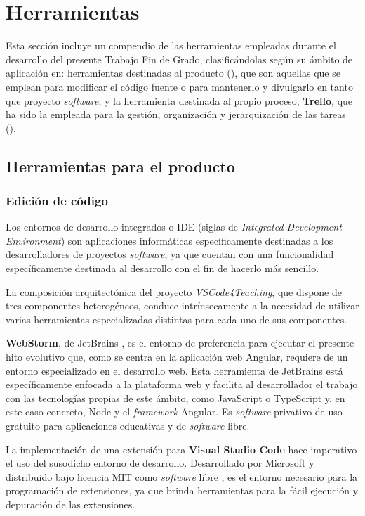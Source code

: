 \section{Herramientas}
\label{sec:herramientas}
Esta sección incluye un compendio de las herramientas empleadas durante el desarrollo del presente Trabajo Fin de Grado, clasificándolas según su ámbito de aplicación en: herramientas destinadas al producto (), que son aquellas que se emplean para modificar el código fuente o para mantenerlo y divulgarlo en tanto que proyecto \textit{software}; y la herramienta destinada al propio proceso, \textbf{Trello}, que ha sido la empleada para la gestión, organización y jerarquización de las tareas ().

\subsection{Herramientas para el producto}
\label{sec:herProducto}

\subsubsection{Edición de código}
\label{subsec:herIDEs}
Los entornos de desarrollo integrados o IDE (siglas de \textit{Integrated Development Environment}) son aplicaciones informáticas específicamente destinadas a los desarrolladores de proyectos \textit{software}, ya que cuentan con una funcionalidad específicamente destinada al desarrollo con el fin de hacerlo más sencillo.

La composición arquitectónica del proyecto \textit{VSCode4Teaching}, que dispone de tres componentes heterogéneos, conduce intrínsecamente a la necesidad de utilizar varias herramientas especializadas distintas para cada uno de sus componentes.

\textbf{WebStorm}, de JetBrains \cite{WebStorm}, es el entorno de preferencia para ejecutar el presente hito evolutivo que, como se centra en la aplicación web Angular, requiere de un entorno especializado en el desarrollo web. Esta herramienta de JetBrains está específicamente enfocada a la plataforma web y facilita al desarrollador el trabajo con las tecnologías propias de este ámbito, como JavaScript o TypeScript y, en este caso concreto, Node y el \textit{framework} Angular. Es \textit{software} privativo de uso gratuito para aplicaciones educativas y de \textit{software} libre.

La implementación de una extensión para \textbf{Visual Studio Code} hace imperativo el uso del susodicho entorno de desarrollo. Desarrollado por Microsoft y distribuido bajo licencia MIT como \textit{software} libre \cite{VSCode}, es el entorno necesario para la programación de extensiones, ya que brinda herramientas para la fácil ejecución y depuración de las extensiones.


